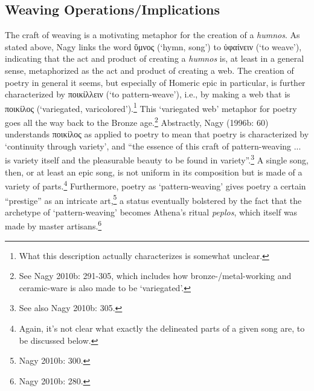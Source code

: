 \documentclass[12pt]{article}
\begin{document}
\subsection{Weaving Operations/Implications}

The craft of weaving is a motivating metaphor for the creation of a \textit{humnos}. As stated above, Nagy links the word ὕμνος (`hymn, song') to ὑφαίνειν (`to weave'), indicating that the act and product of creating a \textit{humnos} is, at least in a general sense, metaphorized as the act and product of creating a web. The creation of poetry in general it seems, but especially of Homeric epic in particular, is further characterized by ποικίλλειν (`to pattern-weave'), i.e., by making a web that is ποικίλος (`variegated, varicolored').\footnote{What this description actually characterizes is somewhat unclear.} This `variegated web' metaphor for poetry goes all the way back to the Bronze age.\footnote{ See Nagy 2010b: 291-305, which includes how bronze-/metal-working and ceramic-ware is also made to be `variegated'.} Abstractly, Nagy (1996b: 60) understands ποικίλος as applied to poetry to mean that poetry is characterized by `continuity through variety', and ``the essence of this craft of pattern-weaving ... is variety itself and the pleasurable beauty to be found in variety''.\footnote{ See also Nagy 2010b: 305.} A single song, then, or at least an epic song, is not uniform in its composition but is made of a variety of parts.\footnote{ Again, it's not clear what exactly the delineated parts of a given song are, to be discussed below.} Furthermore, poetry as `pattern-weaving' gives poetry a certain ``prestige'' as an intricate art,\footnote{ Nagy 2010b: 300.} a status eventually bolstered by the fact that the archetype of `pattern-weaving' becomes Athena's ritual \textit{peplos}, which itself was made by master artisans.\footnote{ Nagy 2010b: 280.}
\end{document}
